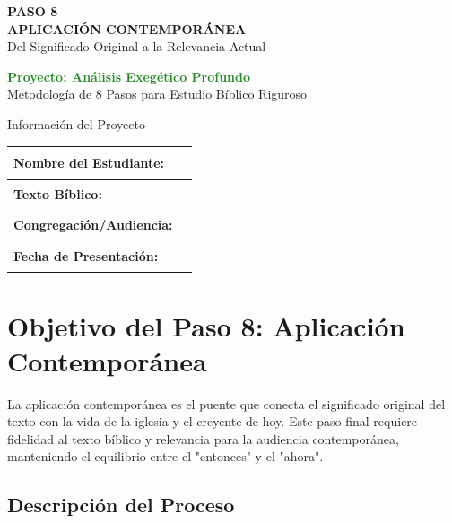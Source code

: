 \documentclass[11pt,a4paper]{article}
\begin{document}
\begin{center}
    {\Huge\color{forestgreen}\textbf{PASO 8}}\\[0.5cm]
    {\Large\color{sagegreen}\textbf{APLICACIÓN CONTEMPORÁNEA}}\\[0.3cm]
    {\large\color{papergray}Del Significado Original a la Relevancia Actual}\\[1cm]
    
    \begin{tcolorbox}[colback=olivegreen!10, colframe=olivegreen, width=0.8\textwidth]
        \centering
        \textcolor{forestgreen}{\textbf{Proyecto: Análisis Exegético Profundo}}\\
        \textcolor{papergray}{Metodología de 8 Pasos para Estudio Bíblico Riguroso}
    \end{tcolorbox}
\end{center}

\vspace{1cm}

\begin{infobox}{Información del Proyecto}
\begin{tabularx}{\textwidth}{|X|X|}
\hline
\textbf{Nombre del Estudiante:} & \rule{6cm}{0.4pt} \\[0.8cm]
\hline
\textbf{Texto Bíblico:} & \rule{6cm}{0.4pt} \\[0.8cm]
\hline
\textbf{Congregación/Audiencia:} & \rule{6cm}{0.4pt} \\[0.8cm]
\hline
\textbf{Fecha de Presentación:} & \rule{6cm}{0.4pt} \\[0.8cm]
\hline
\end{tabularx}
\end{infobox}

\section{Objetivo del Paso 8: Aplicación Contemporánea}

La aplicación contemporánea es el puente que conecta el significado original del texto con la vida de la iglesia y el creyente de hoy. Este paso final requiere fidelidad al texto bíblico y relevancia para la audiencia contemporánea, manteniendo el equilibrio entre el "entonces" y el "ahora".

\subsection{Descripción del Proceso}
\end{document}
